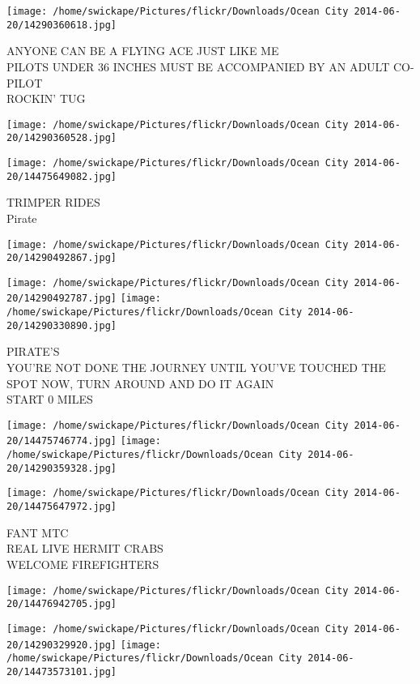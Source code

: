\documentclass[10pt,letterpaper]{article}
\begin{document}
\texttt{[image: /home/swickape/Pictures/flickr/Downloads/Ocean City 2014-06-20/14290360618.jpg]}

ANYONE CAN BE A FLYING ACE JUST LIKE ME\\
PILOTS UNDER 36 INCHES MUST BE ACCOMPANIED BY AN ADULT CO{-}PILOT\\
ROCKIN' TUG\\
\pagebreak

\texttt{[image: /home/swickape/Pictures/flickr/Downloads/Ocean City 2014-06-20/14290360528.jpg]}

\vspace{0.25in}
\texttt{[image: /home/swickape/Pictures/flickr/Downloads/Ocean City 2014-06-20/14475649082.jpg]}

TRIMPER RIDES\\
Pirate\\
\pagebreak

\texttt{[image: /home/swickape/Pictures/flickr/Downloads/Ocean City 2014-06-20/14290492867.jpg]}

\vspace{0.25in}
\texttt{[image: /home/swickape/Pictures/flickr/Downloads/Ocean City 2014-06-20/14290492787.jpg]}
\texttt{[image: /home/swickape/Pictures/flickr/Downloads/Ocean City 2014-06-20/14290330890.jpg]}

PIRATE'S\\
YOU'RE NOT DONE THE JOURNEY UNTIL YOU'VE TOUCHED THE SPOT NOW, TURN AROUND AND DO IT AGAIN\\
START 0 MILES\\
\pagebreak

\texttt{[image: /home/swickape/Pictures/flickr/Downloads/Ocean City 2014-06-20/14475746774.jpg]}
\texttt{[image: /home/swickape/Pictures/flickr/Downloads/Ocean City 2014-06-20/14290359328.jpg]}

\texttt{[image: /home/swickape/Pictures/flickr/Downloads/Ocean City 2014-06-20/14475647972.jpg]}

FANT MTC\\
REAL LIVE HERMIT CRABS\\
WELCOME FIREFIGHTERS\\
\pagebreak

\texttt{[image: /home/swickape/Pictures/flickr/Downloads/Ocean City 2014-06-20/14476942705.jpg]}

\vspace{0.25in}
\texttt{[image: /home/swickape/Pictures/flickr/Downloads/Ocean City 2014-06-20/14290329920.jpg]}
\texttt{[image: /home/swickape/Pictures/flickr/Downloads/Ocean City 2014-06-20/14473573101.jpg]}
\end{document}
